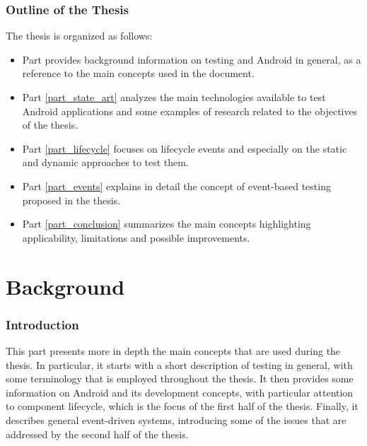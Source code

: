 \documentclass[11pt,a4paper,notitlepage]{article}
\begin{document}
\section{Outline of the Thesis}
The thesis is organized as follows:
\begin{itemize}
	\item Part \ref{part_background} provides background information on testing and Android in general, as a reference to the main concepts used in the document.
	\item Part \ref{part_state_art} analyzes the main technologies available to test Android applications and some examples of research related to the objectives of the thesis.
	\item Part \ref{part_lifecycle} focuses on lifecycle events and especially on the static and dynamic approaches to test them.
	\item Part \ref{part_events} explains in detail the concept of event-based testing proposed in the thesis.
	\item Part \ref{part_conclusion} summarizes the main concepts highlighting applicability, limitations and possible improvements.
\end{itemize}



\newpage
\part{Background}\label{part_background}

\section{Introduction}
This part presents more in depth the main concepts that are used during the thesis. In particular, it starts with a short description of testing in general, with some terminology that is employed throughout the thesis. It then provides some information on Android and its development concepts, with particular attention to component lifecycle, which is the focus of the first half of the thesis. Finally, it describes general event-driven systems, introducing some of the issues that are addressed by the second half of the thesis.
\end{document}
